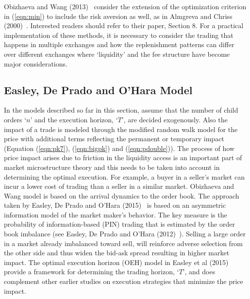 Obizhaeva and Wang (2013)~\cite{obizhaeva} consider the extension of the optimization criterion in (\ref{eqn:min}) to include the risk aversion as well, as in Almgreva and Chriss (2000)~\cite{alm2000}. Interested readers should refer to their paper, Section 8. For a practical implementation of these methods, it is necessary to consider the trading that happens in multiple exchanges and how the replenishment patterns can differ over different exchanges where `liquidity' and the fee structure have become major considerations. 


\subsection{Easley, De Prado and O'Hara Model}


In the models described so far in this section, assume that the number of child orders `$n$' and the execution horizon, `$T$', are decided exogenously. Also the impact of a trade is modeled through the modified random walk model for the price with additional terms reflecting the permanent or temporary impact (Equation (\ref{eqn:pk7}), (\ref{eqn:bigpk}) and (\ref{eqn:pdouble})). The process of how price impact arises due to friction in the liquidity access is an important part of market microstructure theory and this needs to be taken into account in determining the optimal execution. For example, a buyer in a seller's market can incur a lower cost of trading than a seller in a similar market. Obizhaeva and Wang model is based on the arrival dynamics to the order book. The approach taken by Easley, De Prado and O'Hara (2015)~\cite{prado2} is based on an asymmetric information model of the market maker's behavior. The key measure is the probability of information-based (PIN) trading that is estimated by the order book imbalance (see Easley, De Prado and O'Hara (2012)~\cite{prado3}). Selling a large order in a market already imbalanced toward sell, will reinforce adverse selection from the other side and thus widen the bid-ask spread resulting in higher market impact. The optimal execution horizon (OEH) model in Easley et al (2015) provide a framework for determining the trading horizon, `$T$', and does complement other earlier studies on execution strategies that minimize the price impact. 


